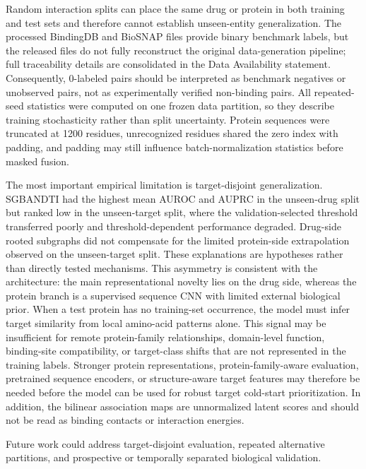 \documentclass[computers,article,submit,moreauthors]{Definitions/mdpi}
\begin{document}
Random interaction splits can place the same drug or protein in both training and test sets and therefore cannot establish unseen-entity generalization. The processed BindingDB and BioSNAP files provide binary benchmark labels, but the released files do not fully reconstruct the original data-generation pipeline; full traceability details are consolidated in the Data Availability statement. Consequently, 0-labeled pairs should be interpreted as benchmark negatives or unobserved pairs, not as experimentally verified non-binding pairs. All repeated-seed statistics were computed on one frozen data partition, so they describe training stochasticity rather than split uncertainty. Protein sequences were truncated at 1200 residues, unrecognized residues shared the zero index with padding, and padding may still influence batch-normalization statistics before masked fusion.

The most important empirical limitation is target-disjoint generalization. SGBANDTI had the highest mean AUROC and AUPRC in the unseen-drug split but ranked low in the unseen-target split, where the validation-selected threshold transferred poorly and threshold-dependent performance degraded. Drug-side rooted subgraphs did not compensate for the limited protein-side extrapolation observed on the unseen-target split. These explanations are hypotheses rather than directly tested mechanisms. This asymmetry is consistent with the architecture: the main representational novelty lies on the drug side, whereas the protein branch is a supervised sequence CNN with limited external biological prior. When a test protein has no training-set occurrence, the model must infer target similarity from local amino-acid patterns alone. This signal may be insufficient for remote protein-family relationships, domain-level function, binding-site compatibility, or target-class shifts that are not represented in the training labels. Stronger protein representations, protein-family-aware evaluation, pretrained sequence encoders, or structure-aware target features may therefore be needed before the model can be used for robust target cold-start prioritization. In addition, the bilinear association maps are unnormalized latent scores and should not be read as binding contacts or interaction energies.

Future work could address target-disjoint evaluation, repeated alternative partitions, and prospective or temporally separated biological validation.
\end{document}
